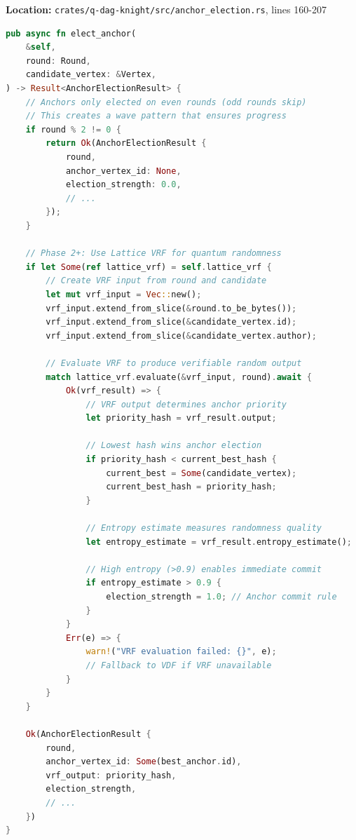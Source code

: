 \documentclass[11pt,a4paper]{article}
\begin{document}
\textbf{Location:} \texttt{crates/q-dag-knight/src/anchor\_election.rs}, lines 160-207

\begin{lstlisting}[language=Rust,caption={VRF-Enhanced Quantum Anchor Election}]
pub async fn elect_anchor(
    &self,
    round: Round,
    candidate_vertex: &Vertex,
) -> Result<AnchorElectionResult> {
    // Anchors only elected on even rounds (odd rounds skip)
    // This creates a wave pattern that ensures progress
    if round % 2 != 0 {
        return Ok(AnchorElectionResult {
            round,
            anchor_vertex_id: None,
            election_strength: 0.0,
            // ...
        });
    }

    // Phase 2+: Use Lattice VRF for quantum randomness
    if let Some(ref lattice_vrf) = self.lattice_vrf {
        // Create VRF input from round and candidate
        let mut vrf_input = Vec::new();
        vrf_input.extend_from_slice(&round.to_be_bytes());
        vrf_input.extend_from_slice(&candidate_vertex.id);
        vrf_input.extend_from_slice(&candidate_vertex.author);

        // Evaluate VRF to produce verifiable random output
        match lattice_vrf.evaluate(&vrf_input, round).await {
            Ok(vrf_result) => {
                // VRF output determines anchor priority
                let priority_hash = vrf_result.output;

                // Lowest hash wins anchor election
                if priority_hash < current_best_hash {
                    current_best = Some(candidate_vertex);
                    current_best_hash = priority_hash;
                }

                // Entropy estimate measures randomness quality
                let entropy_estimate = vrf_result.entropy_estimate();

                // High entropy (>0.9) enables immediate commit
                if entropy_estimate > 0.9 {
                    election_strength = 1.0; // Anchor commit rule
                }
            }
            Err(e) => {
                warn!("VRF evaluation failed: {}", e);
                // Fallback to VDF if VRF unavailable
            }
        }
    }

    Ok(AnchorElectionResult {
        round,
        anchor_vertex_id: Some(best_anchor.id),
        vrf_output: priority_hash,
        election_strength,
        // ...
    })
}
\end{lstlisting}
\end{document}
